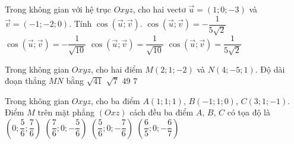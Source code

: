 \begin{ex}%
	Trong không gian với hệ trục $Oxyz$, cho hai vectơ $\overrightarrow{u}=(1;0;-3)$ và $\overrightarrow{v}=(-1;-2;0)$. Tính $\cos\left( \overrightarrow{u};\overrightarrow{v}\right) $.
	\choice
	{\True $\cos\left( \overrightarrow{u};\overrightarrow{v}\right) =-\dfrac{1}{5\sqrt{2}}$}
	{$\cos\left( \overrightarrow{u};\overrightarrow{v}\right) =-\dfrac{1}{\sqrt{10}}$}
	{$\cos\left( \overrightarrow{u};\overrightarrow{v}\right) =\dfrac{1}{\sqrt{10}}$}
	{$\cos\left( \overrightarrow{u};\overrightarrow{v}\right) =\dfrac{1}{5\sqrt{2}}$}
\end{ex}
\begin{ex}%
	Trong không gian $Oxyz$, cho hai điểm $M(2;1;-2)$ và $N(4;-5;1)$. Độ dài đoạn thẳng $MN$ bằng
	\choice
	{$\sqrt{41}$}
	{$\sqrt{7}$}
	{$49$}
	{\True $7$}
\end{ex}
\begin{ex}%
	Trong không gian $Oxyz$, cho ba điểm $A(1;1;1 )$, $B(-1;1;0 )$, $C(3;1;-1 )$. Điểm $M$ trên mặt phẳng $(Oxz )$ cách đều ba điểm $A$, $B$, $C$ có tọa độ là
	\choice 
	{ $\left(0;\dfrac{5}{6};\dfrac{7}{6} \right)$}
	{ $\left(\dfrac{7}{6};0;-\dfrac{5}{6} \right)$}
	{ \True $\left(\dfrac{5}{6};0;-\dfrac{7}{6} \right)$}
	{ $\left(\dfrac{6}{5};0;-\dfrac{6}{7} \right)$} 
\end{ex}
